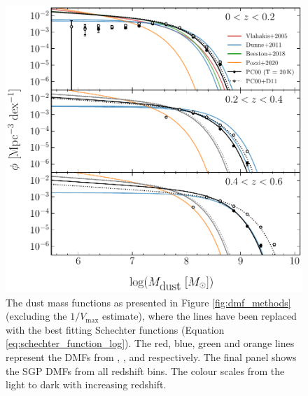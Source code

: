 \begin{figure}
	\centering
	\includegraphics[width=\columnwidth]{Figures/Figure_3_5_part1.pdf}
    \caption[Schechter functions derived from the SGP DMFs alongside relevant studies]{The dust mass functions as presented in Figure \ref{fig:dmf_methods} (excluding the $1/V_{\textrm{max}}$ estimate), where the lines have been replaced with the best fitting Schechter functions (Equation \ref{eq:schechter_function_log}). The red, blue, green and orange lines represent the DMFs from \citealt{Vlahakis_2005}, \citealt{Dunne_2011}, \citealt{Beeston_2018} and \citealt{Pozzi_2020} respectively. The final panel shows the SGP DMFs from all redshift bins. The colour scales from the light to dark with increasing redshift.}
	\label{fig:dmf_schechter}
\end{figure}

